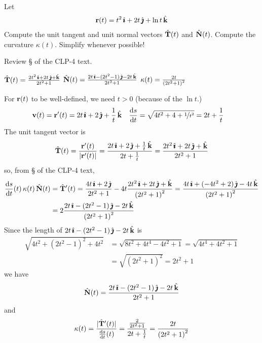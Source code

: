 \begin{question}[M317 2006D] %
Let
\begin{align*}
\mathbf{r}(t) = t^2\,\hat{\pmb{\imath}} + 2t\,\hat{\pmb{\jmath}} + \ln t\,\hat{\mathbf{k}}
\end{align*}
Compute the unit tangent and unit normal vectors $\hat{\mathbf{T}}(t)$ and $\hat{\mathbf{N}}(t)$. Compute the curvature $\kappa(t)$. Simplify whenever possible!
\end{question}

\begin{hint} 
Review \S{} of the CLP-4 text.
\end{hint}

\begin{answer} 
$\hat{\mathbf{T}}(t) =\frac{2t^2\,\hat{\pmb{\imath}} + 2t\,\hat{\pmb{\jmath}} + \hat{\mathbf{k}}}{2t^2+1}$\qquad
$\hat{\mathbf{N}}(t) =\frac{2t\,\hat{\pmb{\imath}} - (2t^2-1)\,\hat{\pmb{\jmath}} -2t\, \hat{\mathbf{k}}}{2t^2+1}$\qquad
$\kappa(t) = \frac{2t}{{(2t^2+1)}^2}$
\end{answer}

\begin{solution}
For $\mathbf{r}(t)$ to be well-defined, we need $t>0$ (because of the $\ln t$.)
\begin{align*}
\vv(t)=\vr'(t)&=2t\,\hi + 2\,\hj + \frac{1}{t}\,\hk &
\diff{s}{t} &= \sqrt{4t^2+4+\nicefrac{1}{t^2}}
              =2t+\frac{1}{t} 
\end{align*}
The unit tangent vector is
\begin{align*}
\hat{\mathbf{T}}(t) = \frac{\mathbf{r}'(t)}{|\mathbf{r}'(t)|}
           =\frac{2t\,\hat{\pmb{\imath}} + 2\,\hat{\pmb{\jmath}} + \frac{1}{t}\,\hat{\mathbf{k}}}{2t+\frac{1}{t}}
           =\frac{2t^2\,\hat{\pmb{\imath}} + 2t\,\hat{\pmb{\jmath}} + \hat{\mathbf{k}}}{2t^2+1}
\end{align*}
so, from  \S{} of the CLP-4 text,
\begin{align*}
\diff{s}{t}(t)\, \ka(t)\,\hat\vN(t) &= \hat\vT'(t)
                 =\frac{4t\,\hi + 2\,\hj }{2t^2+1}
                  -4t\frac{2t^2\,\hi + 2t\,\hj + \hk}{{(2t^2+1)}^2}
                 =\frac{4t\,\hi + (-4t^2+2)\,\hj -4t\, \hk}{{(2t^2+1)}^2} \\
&=2\frac{2t\,\hi - (2t^2-1)\,\hj -2t\, \hk}{{(2t^2+1)}^2}
\end{align*}
Since the length of $2t\,\hat{\pmb{\imath}} - (2t^2-1)\,\hat{\pmb{\jmath}} -2t\, \hat{\mathbf{k}}$ is
\begin{align*}
\sqrt{4t^2 + (2t^2-1)^2+4t^2}
&=\sqrt{8t^2 + 4t^4 -4 t^2 + 1}
=\sqrt{ 4t^4 +4 t^2 + 1} \\
&=\sqrt{(2t^2+1)^2} 
=2t^2+1
\end{align*}
we have
\begin{align*}
\hat{\mathbf{N}}(t) =\frac{2t\,\hat{\pmb{\imath}} - (2t^2-1)\,\hat{\pmb{\jmath}} -2t\, \hat{\mathbf{k}}}{2t^2+1}
\end{align*}
and
\begin{align*}
\ka(t) = \frac{|\hat\vT'(t)|}{\diff{s}{t}(t)}
=\frac{\frac{2}{2t^2+1}}{2t+\frac{1}{t}}
=\frac{2t}{{(2t^2+1)}^2}
\end{align*}
\end{solution}



